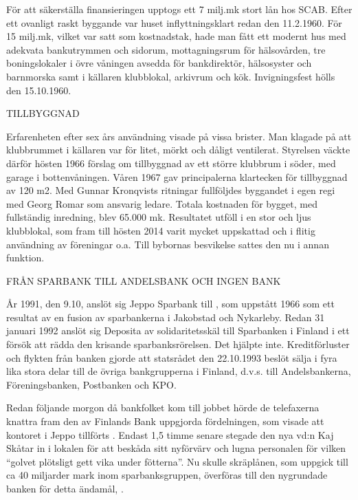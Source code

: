 För att säkerställa finansieringen upptogs ett 7 milj.mk stort lån hos SCAB. Efter ett ovanligt raskt byggande var huset inflyttningsklart redan den 11.2.1960. För 15 milj.mk, vilket var satt som kostnadstak, hade man fått ett modernt hus med adekvata bankutrymmen och sidorum, mottagningsrum för hälsovården, tre boningslokaler i övre våningen avsedda för bankdirektör, hälsosyster och barnmorska samt i källaren klubblokal, arkivrum och kök. Invigningsfest hölls den 15.10.1960.



TILLBYGGNAD

Erfarenheten efter sex års användning visade på vissa brister. Man klagade på att klubbrummet i källaren var för litet, mörkt och dåligt ventilerat. Styrelsen väckte därför hösten 1966 förslag om tillbyggnad av ett större klubbrum i söder, med garage i bottenvåningen. Våren 1967 gav principalerna klartecken för tillbyggnad av 120 m2. Med Gunnar Kronqvists ritningar fullföljdes byggandet i egen regi med Georg Romar som ansvarig ledare. Totala kostnaden för bygget, med fullständig inredning, blev 65.000 mk. Resultatet utföll i en stor och ljus klubblokal, som fram till hösten 2014 varit mycket uppskattad och i flitig användning av föreningar o.a. Till bybornas besvikelse sattes den nu i annan funktion.


FRÅN SPARBANK TILL ANDELSBANK OCH INGEN BANK

År 1991, den 9.10, anslöt sig Jeppo Sparbank till , som uppstått 1966 som ett resultat av en fusion av sparbankerna i Jakobstad och Nykarleby. Redan 31 januari 1992 anslöt sig Deposita av solidaritetsskäl till Sparbanken i Finland i ett försök att rädda den krisande sparbanksrörelsen. Det hjälpte inte. Kreditförluster och flykten från banken gjorde att statsrådet den 22.10.1993 beslöt sälja  i fyra lika stora delar till de övriga bankgrupperna i Finland, d.v.s. till Andelsbankerna, Föreningsbanken, Postbanken och KPO.

Redan följande morgon då bankfolket kom till jobbet hörde de telefaxerna knattra fram den av Finlands Bank uppgjorda fördelningen, som visade att kontoret i Jeppo tillförts . Endast 1,5 timme senare stegade den nya vd:n Kaj Skåtar in i lokalen för att beskåda sitt nyförvärv och lugna personalen för vilken ``golvet plötsligt gett vika under fötterna''. Nu skulle skräplånen, som uppgick till ca 40 miljarder mark inom sparbanksgruppen, överföras till den nygrundade banken för detta ändamål, .

